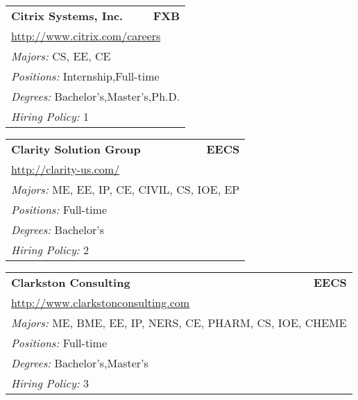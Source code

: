 \documentclass[twoside]{article}
\begin{document}
\begin{center}
\begin{multicols}{3}
\begin{FlushLeft}
\begin{minipage}{\columnwidth}
\end{minipage}
 
\begin{minipage}{\columnwidth}\begin{tabularx}{.95\columnwidth}{Xr}
                 {\Large\bf Citrix Systems, Inc.} & {\Large\bf FXB}\\
    \multicolumn{2}{p{.95\columnwidth}}{\url{http://www.citrix.com/careers}}\\
    \multicolumn{2}{p{.95\columnwidth}}{\emph{Majors:} CS, EE, CE}\\
    \multicolumn{2}{p{.95\columnwidth}}{\emph{Positions:} Internship,Full-time}\\
    \multicolumn{2}{p{.95\columnwidth}}{\emph{Degrees:} Bachelor's,Master's,Ph.D.}\\
    \multicolumn{2}{p{.95\columnwidth}}{\emph{Hiring Policy:} 1}\\
    \end{tabularx}
    
\end{minipage}
 
\begin{minipage}{\columnwidth}\begin{tabularx}{.95\columnwidth}{Xr}
                 {\Large\bf Clarity Solution Group} & {\Large\bf EECS}\\
    \multicolumn{2}{p{.95\columnwidth}}{\url{http://clarity-us.com/}}\\
    \multicolumn{2}{p{.95\columnwidth}}{\emph{Majors:} ME, EE, IP, CE, CIVIL, CS, IOE, EP}\\
    \multicolumn{2}{p{.95\columnwidth}}{\emph{Positions:} Full-time}\\
    \multicolumn{2}{p{.95\columnwidth}}{\emph{Degrees:} Bachelor's}\\
    \multicolumn{2}{p{.95\columnwidth}}{\emph{Hiring Policy:} 2}\\
    \end{tabularx}
    
\end{minipage}
 
\begin{minipage}{\columnwidth}\begin{tabularx}{.95\columnwidth}{Xr}
                 {\Large\bf Clarkston Consulting} & {\Large\bf EECS}\\
    \multicolumn{2}{p{.95\columnwidth}}{\url{http://www.clarkstonconsulting.com}}\\
    \multicolumn{2}{p{.95\columnwidth}}{\emph{Majors:} ME, BME, EE, IP, NERS, CE, PHARM, CS, IOE, CHEME}\\
    \multicolumn{2}{p{.95\columnwidth}}{\emph{Positions:} Full-time}\\
    \multicolumn{2}{p{.95\columnwidth}}{\emph{Degrees:} Bachelor's,Master's}\\
    \multicolumn{2}{p{.95\columnwidth}}{\emph{Hiring Policy:} 3}\\
    \end{tabularx}
    

\end{minipage}
\end{FlushLeft}
\end{multicols}
\end{center}
\end{document}
